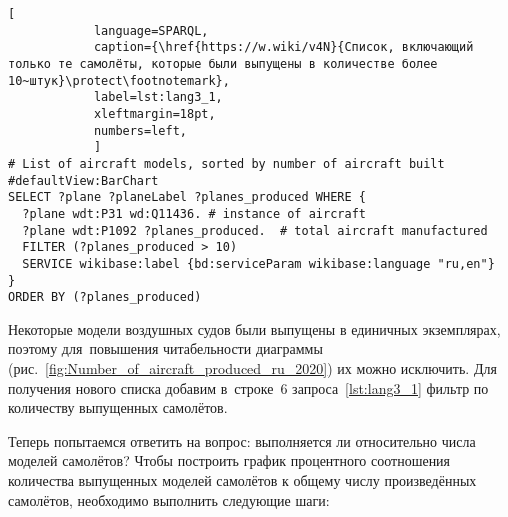 \begin{lstlisting}[ 
            language=SPARQL, 
            caption={\href{https://w.wiki/v4N}{Список, включающий только те самолёты, которые были выпущены в количестве более 10~штук}\protect\footnotemark}, 
            label=lst:lang3_1, 
            xleftmargin=18pt, 
            numbers=left,
            ]
# List of aircraft models, sorted by number of aircraft built
#defaultView:BarChart
SELECT ?plane ?planeLabel ?planes_produced WHERE {
  ?plane wdt:P31 wd:Q11436. # instance of aircraft
  ?plane wdt:P1092 ?planes_produced.  # total aircraft manufactured
  FILTER (?planes_produced > 10)
  SERVICE wikibase:label {bd:serviceParam wikibase:language "ru,en"}
}
ORDER BY (?planes_produced)
\end{lstlisting}


\newpage
Некоторые модели воздушных судов были выпущены в единичных экземплярах, 
поэтому для~повышения читабельности диаграммы 
(рис.~\ref{fig:Number_of_aircraft_produced_ru_2020}) их можно исключить. 
Для получения нового списка добавим в~строке~6 запроса~\ref{lst:lang3_1} 
фильтр по количеству выпущенных самолётов.



Теперь 
 попытаемся ответить на вопрос: выполняется ли  относительно числа моделей самолётов?
Чтобы построить график процентного соотношения количества выпущенных моделей самолётов 
к общему числу произведённых самолётов, необходимо выполнить следующие шаги:

